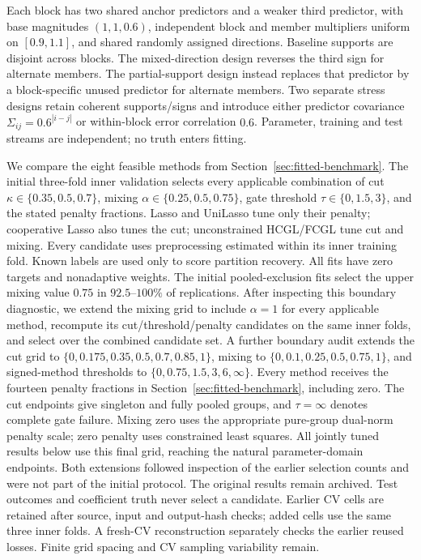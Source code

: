 \documentclass[11pt,a4paper]{article}
\begin{document}
Each block has two shared anchor predictors and a weaker third predictor, with
base magnitudes $(1,1,0.6)$, independent block and member multipliers uniform on
$[0.9,1.1]$, and shared randomly assigned directions. Baseline supports are
disjoint across blocks. The mixed-direction design reverses the third sign for
alternate members. The partial-support design instead replaces that predictor
by a block-specific unused predictor for alternate members. Two separate stress
designs retain coherent supports/signs and introduce either predictor covariance
$\Sigma_{ij}=0.6^{|i-j|}$ or within-block error correlation $0.6$.
Parameter, training and test streams are independent; no truth enters fitting.

We compare the eight feasible methods from Section~\ref{sec:fitted-benchmark}.
The initial three-fold inner validation selects every applicable combination of
cut $\kappa\in\{0.35,0.5,0.7\}$, mixing
$\alpha\in\{0.25,0.5,0.75\}$, gate threshold
$\tau\in\{0,1.5,3\}$, and the stated penalty fractions.
Lasso and UniLasso tune only their penalty; cooperative Lasso also tunes the cut;
unconstrained HCGL/FCGL tune cut and mixing. Every candidate uses preprocessing
estimated within its inner training fold. Known labels are used only to score
partition recovery. All fits have zero targets and nonadaptive weights.
The initial pooled-exclusion fits select the upper mixing value $0.75$ in
$92.5$--$100\%$ of replications. After inspecting this boundary diagnostic, we
extend the mixing grid to include $\alpha=1$ for every applicable method,
recompute its cut/threshold/penalty candidates on the same inner folds, and
select over the combined candidate set. A further boundary audit extends the
cut grid to $\{0,0.175,0.35,0.5,0.7,0.85,1\}$, mixing to
$\{0,0.1,0.25,0.5,0.75,1\}$, and signed-method thresholds to
$\{0,0.75,1.5,3,6,\infty\}$. Every method receives the fourteen penalty
fractions in Section~\ref{sec:fitted-benchmark}, including zero. The cut
endpoints give singleton and fully pooled groups, and $\tau=\infty$ denotes
complete gate failure. Mixing zero uses the appropriate pure-group dual-norm
penalty scale; zero penalty uses constrained least squares.
All jointly tuned results below use this final grid, reaching the natural
parameter-domain endpoints. Both extensions followed inspection of the earlier
selection counts and were not part of the initial protocol. The original results
remain archived. Test outcomes and coefficient truth never select a candidate.
Earlier CV cells are retained after source, input and output-hash checks; added
cells use the same three inner folds. A fresh-CV reconstruction separately checks
the earlier reused losses. Finite grid spacing and CV sampling variability remain.
\end{document}
